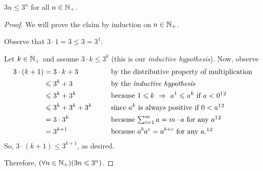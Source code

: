 \begin{lemma}
    $3n \leq 3^n$ for all $n \in \mathbb{N}_+$.
\end{lemma}
\begin{proof}
    We will prove the claim by induction on $n \in \mathbb{N}_+$.
    \begin{case}
        Observe that $3 \cdot 1 = 3 \leq 3 = 3^1$.
    \end{case}
    \begin{case}
        Let $k \in \mathbb{N}_+$ and assume $3 \cdot k \leq 3^k$
        (this is our \emph{inductive hypothesis}).
        Now, observe
        \begin{alignat*}{2}
            3 \cdot (k + 1) &= 3 \cdot k + 3 &&\text{ by the distributive property of multiplication} \\
                            &\leq 3^k + 3 &&\text{ by the \emph{inductive hypothesis}} \\
                            &\leq 3^k + 3^k &&\text{ because $1 \leq k \implies a^1 \leq a^k$ if $a < 0$}\footnotemark[1]\footnotemark[2] \\
                            &\leq 3^k + 3^k + 3^k~~~~&&\text{ since $a^k$ is always positive if $0 < a$}\footnotemark[1]\footnotemark[2] \\
                            &= 3 \cdot 3^k &&\text{ because $\textstyle \sum_{i = 1}^{m}a = m \cdot a$ for any $a$}\footnotemark[1]\footnotemark[2] \\
                            &= 3^{k + 1} &&\text{ because $a^ba^c = a^{b + c}$ for any $a$}.\footnotemark[1]\footnotemark[2]
        \end{alignat*}
        So, $3 \cdot (k + 1) \leq 3^{k + 1}$, as desired.
    \end{case}
    Therefore, $\pn*{\forall n \in \N_+}\pn*{3n \leq 3^n}$.
\end{proof}


